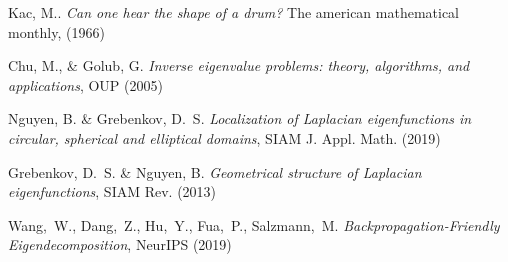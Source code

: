 \documentclass[a4paper,11pt]{article}
\begin{document}
\vspace{-1.5em}
\renewcommand{\refname}{\normalsize Références}
%
\begin{thebibliography}{99}
\vspace{-1em}
{\scriptsize
{}
	Kac, M..
	{\it Can one hear the shape of a drum?}
	The american mathematical monthly, (1966)

	Chu, M., \& Golub, G.
	{\it Inverse eigenvalue problems: theory, algorithms, and
	applications}, OUP (2005)

	Nguyen, B. \& Grebenkov, D.~S.
	{\it Localization of Laplacian eigenfunctions in circular, spherical
	and elliptical domains}, SIAM J.  Appl. Math. (2019)

	Grebenkov, D.~S.  \& Nguyen, B.
	{\it Geometrical structure of Laplacian eigenfunctions},
	SIAM Rev. (2013)

	Wang,~W., Dang,~Z., Hu,~Y., Fua,~P., Salzmann,~M.
	{\it Backpropagation-Friendly Eigendecomposition},
	NeurIPS (2019)

}
\end{thebibliography}
\end{document}

